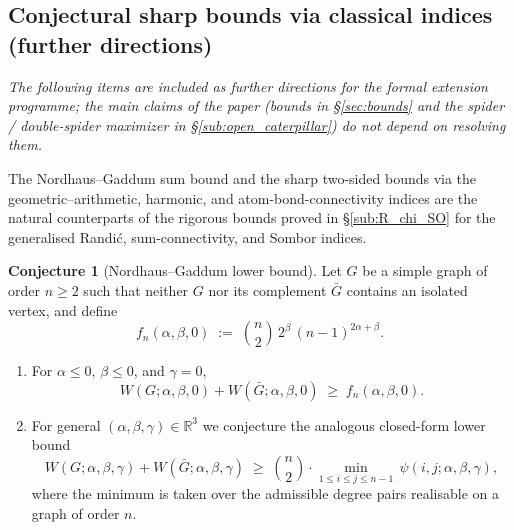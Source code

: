 \documentclass[11pt,a4paper]{article}
\theoremstyle{definition}
\newtheorem{conjecture}[theorem]{Conjecture}
\begin{document}
\subsection{Conjectural sharp bounds via classical indices (further directions)}\label{sub:open_bounds}

\noindent\emph{The following items are included as further
directions for the formal extension programme; the main claims of
the paper (bounds in \S\ref{sec:bounds} and the spider /
double-spider maximizer in \S\ref{sub:open_caterpillar}) do not
depend on resolving them.}

The Nordhaus--Gaddum sum bound and the sharp two-sided bounds via
the geometric--arithmetic, harmonic, and atom-bond-connectivity
indices are the natural counterparts of the rigorous bounds proved
in \S\ref{sub:R_chi_SO} for the generalised Randi\'c, sum-connectivity,
and Sombor indices.

\begin{conjecture}[Nordhaus--Gaddum lower bound]\label{conj:NG}
Let $G$ be a simple graph of order $n \ge 2$ such that neither $G$
nor its complement $\bar G$ contains an isolated vertex, and define
\begin{equation}\label{eq:NG_fn_easy}
f_n(\alpha, \beta, 0) \;:=\; \binom{n}{2}\, 2^{\beta}\, (n - 1)^{2\alpha + \beta}.
\end{equation}
\begin{enumerate}[label=(\alph*)]
\item For $\alpha \le 0$, $\beta \le 0$, and $\gamma = 0$,
\begin{equation}\label{eq:NG_easy}
W(G;\alpha,\beta,0) + W(\bar G;\alpha,\beta,0)
\;\ge\; f_n(\alpha, \beta, 0).
\end{equation}
\item For general $(\alpha, \beta, \gamma) \in \mathbb{R}^3$ we
conjecture the analogous closed-form lower bound
\begin{equation}\label{eq:NG_general}
W(G;\alpha,\beta,\gamma) + W(\bar G;\alpha,\beta,\gamma)
\;\ge\; \binom{n}{2}\cdot
\min_{1 \le i \le j \le n-1}\,\psi(i, j;\alpha,\beta,\gamma),
\end{equation}
where the minimum is taken over the admissible degree pairs
realisable on a graph of order $n$.
\end{enumerate}
\end{conjecture}
\end{document}
